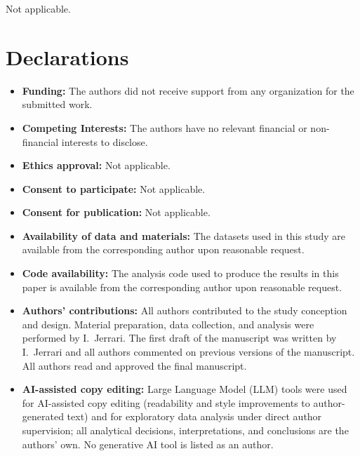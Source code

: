 \documentclass[pdflatex,sn-mathphys-num]{sn-jnl}
\theoremstyle{thmstyleone}
\theoremstyle{thmstylethree}
\begin{document}
\backmatter

Not applicable.

\section*{Declarations}

\begin{itemize}
\item \textbf{Funding:} The authors did not receive support from any
  organization for the submitted work.
\item \textbf{Competing Interests:} The authors have no relevant
  financial or non-financial interests to disclose.
\item \textbf{Ethics approval:} Not applicable.
\item \textbf{Consent to participate:} Not applicable.
\item \textbf{Consent for publication:} Not applicable.
\item \textbf{Availability of data and materials:} The datasets used
  in this study are available from the corresponding author upon
  reasonable request.
\item \textbf{Code availability:} The analysis code used to produce
  the results in this paper is available from the corresponding
  author upon reasonable request.
\item \textbf{Authors' contributions:} All authors contributed to the
  study conception and design. Material preparation, data collection,
  and analysis were performed by I.~Jerrari. The first draft of the
  manuscript was written by I.~Jerrari and all authors commented on
  previous versions of the manuscript. All authors read and approved
  the final manuscript.
\item \textbf{AI-assisted copy editing:} Large Language Model (LLM)
  tools were used for AI-assisted copy editing (readability and style
  improvements to author-generated text) and for exploratory data
  analysis under direct author supervision; all analytical decisions,
  interpretations, and conclusions are the authors' own. No generative
  AI tool is listed as an author.
\end{itemize}
\end{document}
